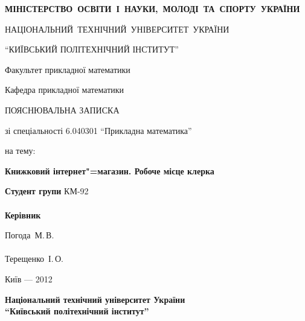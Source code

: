 \documentclass[a4paper,notitlepage,headsepline,pdftex,oneside]{report}
\newcommand{\setfontsize}[1]{\fontsize{#1pt}{#1pt}\selectfont}
\begin{document}
\setfontsize{14pt}
\renewcommand{\baselinestretch}{1.5}
\begin{titlepage}
  \begin{center}
\setfontsize{14pt}
\renewcommand{\baselinestretch}{1.5}
{\bf
    \mbox{\MakeUppercase{Міністерство освіти і науки, молоді та спорту
    України}}

    \mbox{\MakeUppercase{Національний технічний університет України}}

    \MakeUppercase{``Київський політехнічний інститут''}

    \vspace{2cm}


    Факультет прикладної математики

    Кафедра прикладної математики

    \vfill

    ПОЯСНЮВАЛЬНА ЗАПИСКА
  }

    зі спеціальності 6.040301 ``Прикладна математика''

    на тему:

    \textbf{Книжковий інтернет"=магазин. Робоче місце клерка}
  \end{center}

  \vfill

  \begin{minipage}{0.4\textwidth}
  \noindent
  \textbf{Студент групи} КМ-92\\
  \hspace{1cm}\\
  \noindent
  \textbf{Керівник}\\
  \end{minipage}
  \begin{minipage}{0.4\textwidth}
    \noindent
    Погода~М.\,В.\hfill\underline{\hspace{1.5cm}}\\
    \hspace{1cm}\\
    \noindent
    Терещенко~І.\,О.\hfill\underline{\hspace{1.5cm}}\\
  \end{minipage}

  \vfill

  \begin{center}
    Київ --- 2012
  \end{center}
\end{titlepage}
\thispagestyle{empty}
\setfontsize{14pt}
\renewcommand{\baselinestretch}{1.5}
\begin{center}
\setfontsize{14pt}
\renewcommand{\baselinestretch}{1.5}
  \bf
  Національний технічний університет України\\
  ``Київський політехнічний інститут''\\
\end{center}
\end{document}
